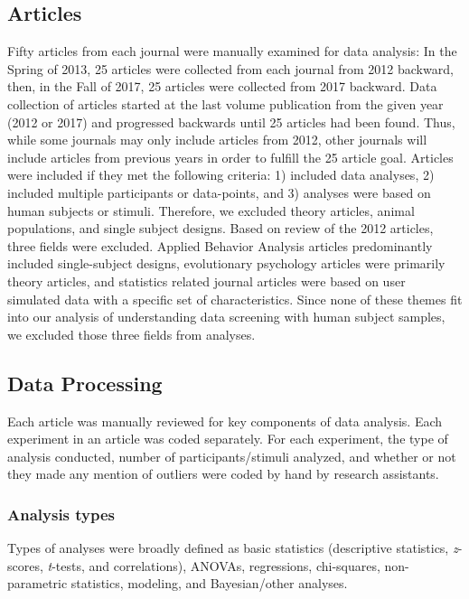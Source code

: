 \documentclass[english,,man]{apa6}
\theoremstyle{definition}
\theoremstyle{definition}
\theoremstyle{definition}
\theoremstyle{remark}
\begin{document}
\subsection{Articles}\label{articles}

Fifty articles from each journal were manually examined for data
analysis: In the Spring of 2013, 25 articles were collected from each
journal from 2012 backward, then, in the Fall of 2017, 25 articles were
collected from 2017 backward. Data collection of articles started at the
last volume publication from the given year (2012 or 2017) and
progressed backwards until 25 articles had been found. Thus, while some
journals may only include articles from 2012, other journals will
include articles from previous years in order to fulfill the 25 article
goal. Articles were included if they met the following criteria: 1)
included data analyses, 2) included multiple participants or
data-points, and 3) analyses were based on human subjects or stimuli.
Therefore, we excluded theory articles, animal populations, and single
subject designs. Based on review of the 2012 articles, three fields were
excluded. Applied Behavior Analysis articles predominantly included
single-subject designs, evolutionary psychology articles were primarily
theory articles, and statistics related journal articles were based on
user simulated data with a specific set of characteristics. Since none
of these themes fit into our analysis of understanding data screening
with human subject samples, we excluded those three fields from
analyses.

\subsection{Data Processing}\label{data-processing}

Each article was manually reviewed for key components of data analysis.
Each experiment in an article was coded separately. For each experiment,
the type of analysis conducted, number of participants/stimuli analyzed,
and whether or not they made any mention of outliers were coded by hand
by research assistants.

\subsubsection{Analysis types}\label{analysis-types}

Types of analyses were broadly defined as basic statistics (descriptive
statistics, \emph{z}-scores, \emph{t}-tests, and correlations), ANOVAs,
regressions, chi-squares, non-parametric statistics, modeling, and
Bayesian/other analyses.
\end{document}
